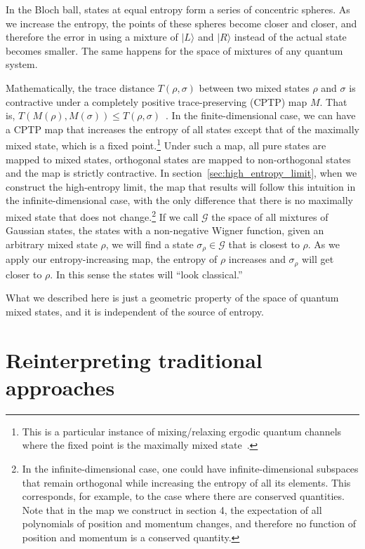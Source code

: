 \documentclass{article}
\def\>{\rangle}
\begin{document}
In the Bloch ball, states at equal entropy form a series of concentric spheres. As we increase the entropy, the points of these spheres become closer and closer, and therefore the error in using a mixture of $|L\>$ and $|R\>$ instead of the actual state becomes smaller. The same happens for the space of mixtures of any quantum system.

Mathematically, the trace distance $T(\rho,\sigma)$ between two mixed states $\rho$ and $\sigma$ is contractive under a completely positive trace-preserving (CPTP) map $M$. That is, $T(M(\rho),M(\sigma)) \leq T(\rho,\sigma)$~\cite{nielsen2010quantum}. In the finite-dimensional case, we can have a CPTP map that increases the entropy of all states except that of the maximally mixed state, which is a fixed point.\footnote{This is a particular instance of mixing/relaxing ergodic quantum channels where the fixed point is the maximally mixed state~\cite{Burgarth2012ErgodicAM}.}  Under such a map, all pure states are mapped to mixed states, orthogonal states are mapped to non-orthogonal states and the map is strictly contractive. In section~\ref{sec:high_entropy_limit}, when we construct the high-entropy limit, the map that results will follow this intuition in the infinite-dimensional case, with the only difference that there is no maximally mixed state that does not change.\footnote{In the infinite-dimensional case, one could have infinite-dimensional subspaces that remain orthogonal while increasing the entropy of all its elements. This corresponds, for example, to the case where there are conserved quantities. Note that in the map we construct in section 4, the expectation of all polynomials of position and momentum changes, and therefore no function of position and momentum is a conserved quantity. }  If we call $\mathcal{G}$ the space of all mixtures of Gaussian states, the states with a non-negative Wigner function, given an arbitrary mixed state $\rho$, we will find a state $\sigma_{\rho} \in \mathcal{G}$ that is closest to $\rho$. As we apply our entropy-increasing map, the entropy of $\rho$ increases and $\sigma_{\rho}$ will get closer to $\rho$. In this sense the states will ``look classical.''

What we described here is just a geometric property of the space of quantum mixed states, and it is independent of the source of entropy.

\section{Reinterpreting traditional approaches}
\end{document}
